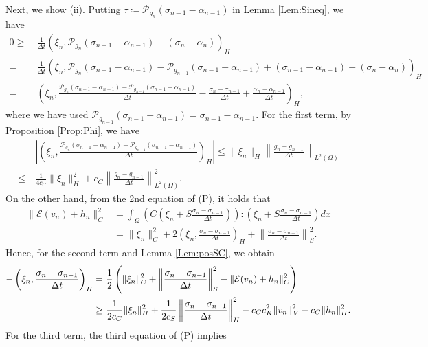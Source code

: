 \documentclass[11pt, a4paper]{article}
\newcommand{\defeq}{\coloneqq}
\newcommand{\into}{\int_\Omega}
\newcommand{\dt}{{\Delta t}}
\newcommand{\E}{{\mathcal{E}}}
\newcommand{\bm}[1]{\textbf{\textit{#1}}}%
\newcommand{\Vv}{{\bm{V}}}
\newcommand{\Hs}{{H}}
\newcommand{\Pop}[1]{\mathcal{P}_{#1}}
\begin{document}
Next, we show (ii). Putting $\tau \defeq \Pop{g_n}(\sigma_{n-1} - \alpha_{n-1})$ in Lemma \ref{Lem:Sineq}, we have
\begin{align*}
    0 \ge~& \frac{1}{\dt}(\xi_n, \Pop{g_n}(\sigma_{n-1} - \alpha_{n-1}) - (\sigma_n-\alpha_n))_\Hs\\
    =~& \frac{1}{\dt}(\xi_n, \Pop{g_n}(\sigma_{n-1} - \alpha_{n-1}) 
    - \Pop{g_{n-1}}(\sigma_{n-1} - \alpha_{n-1}) 
    + (\sigma_{n-1} - \alpha_{n-1}) - (\sigma_n-\alpha_n))_\Hs\\
    =~& \left(\xi_n, \frac{\Pop{g_n}(\sigma_{n-1} - \alpha_{n-1}) 
    - \Pop{g_{n-1}}(\sigma_{n-1} - \alpha_{n-1})}{\dt} 
    - \frac{\sigma_n - \sigma_{n-1}}{\dt}
    + \frac{\alpha_n - \alpha_{n-1}}{\dt} \right)_\Hs,
\end{align*}
where we have used $\Pop{g_{n-1}}(\sigma_{n-1} - \alpha_{n-1}) = \sigma_{n-1} - \alpha_{n-1}$.
For the first term, by Proposition \ref{Prop:Phi}, we have 
\begin{align*}
    &\left|\left(\xi_n, 
    \frac{\Pop{g_n}(\sigma_{n-1} - \alpha_{n-1}) - \Pop{g_{n-1}}(\sigma_{n-1} - \alpha_{n-1})}{\dt} \right)_\Hs\right|
    \le \|\xi_n\|_\Hs \left\|\frac{g_n - g_{n-1}}{\dt}\right\|_{L^2(\Omega)}\\
    \le~& \frac{1}{4c_C}\|\xi_n\|_\Hs^2 
    + c_C\left\|\frac{g_n - g_{n-1}}{\dt}\right\|_{L^2(\Omega)}^2.
\end{align*}
On the other hand, from the 2nd equation of (P), it holds that 
\begin{align*}
    \|\E(v_n) + h_n\|_C^2
    &= \into \left(C\left(\xi_n + S\frac{\sigma_n - \sigma_{n-1}}{\dt}\right)\right):\left(\xi_n + S\frac{\sigma_n - \sigma_{n-1}}{\dt}\right) dx\\
    &= \|\xi_n\|_C^2 
    + 2\left(\xi_n, \frac{\sigma_n - \sigma_{n-1}}{\dt}\right)_\Hs 
    + \left\|\frac{\sigma_n - \sigma_{n-1}}{\dt}\right\|_S^2.
\end{align*}
Hence, for the second term and Lemma \ref{Lem:posSC}, we obtain
\begin{align*}
    - \left(\xi_n, \frac{\sigma_n - \sigma_{n-1}}{\dt}\right)_\Hs 
    =~& \frac{1}{2}\left( \|\xi_n\|_C^2 
    + \left\|\frac{\sigma_n - \sigma_{n-1}}{\dt}\right\|_S^2
    - \|\E(v_n) + h_n\|_C^2\right)\\
    \ge~& \frac{1}{2c_C}\|\xi_n\|_\Hs^2 
    + \frac{1}{2c_S}\left\|\frac{\sigma_n - \sigma_{n-1}}{\dt}\right\|_\Hs^2
    - c_C c_K^2\|v_n\|_\Vv^2 - c_C\|h_n\|_\Hs^2.
\end{align*}
For the third term, the third equation of (P) implies
\end{document}
